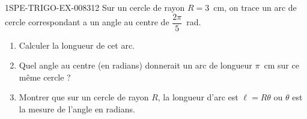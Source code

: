\begin{exercice}{1SPE-TRIGO-EX-008}{3}{12}
Sur un cercle de rayon $R = 3$~cm, on trace un arc de cercle correspondant a un angle au centre de $\dfrac{2\pi}{5}$~rad.
\begin{enumerate}
  \item Calculer la longueur de cet arc.
  \item Quel angle au centre (en radians) donnerait un arc de longueur $\pi$~cm sur ce même cercle ?
  \item Montrer que sur un cercle de rayon $R$, la longueur d'arc est $\ell = R\theta$ ou $\theta$ est la mesure de l'angle en radians.
\end{enumerate}
\end{exercice}
